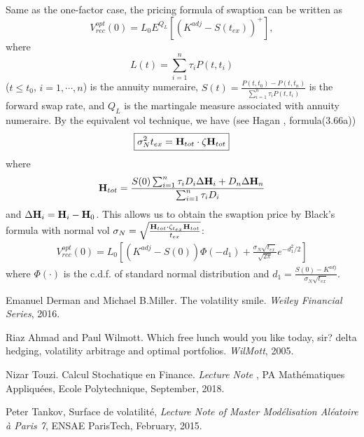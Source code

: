 \documentclass[10pt]{article}
\theoremstyle{plain}
\numberwithin{equation}{section}
\numberwithin{table}{section}
\begin{document}
Same as the one-factor case, the pricing formula of swaption can be written as
\[
V^{opt}_{rec}(0) = L_0 E^{Q_L}[(K^{adj}- S(t_{ex}))^+],
\]
where
\[
L(t) = \sum_{i=1}^n\tau_i P(t,t_i)
\]
($t\le t_0$, $i=1,\cdots, n$) is the annuity numeraire,
$S(t)=\frac{P(t,t_0)-P(t,t_n)}{\sum_{i=1}^n\tau_iP(t,t_i)}$ is the
forward swap rate, and $Q_L$ is the martingale measure associated with
annuity numeraire. By the equivalent vol technique, we have (see Hagan
\cite{Haganb}, formula(3.66a))
\begin{eqnarray}\label{formula_HW2F_calib_normal_vol}
\boxed{
\sigma_N^2t_{ex} = {\bf H}_{tot} \cdot \zeta {\bf H}_{tot}
}
\end{eqnarray}
where
\[
{\bf H}_{tot} = \frac{S(0)\sum_{i=1}^n \tau_i D_i \Delta {\bf H}_i +
D_n\Delta {\bf H}_n}{\sum_{i=1}^n\tau_iD_i}
\]
and $\Delta {\bf H}_i = {\bf H}_i - {\bf H}_0$. This allows us to
obtain the swaption price by Black's formula with normal vol $\sigma_N
= \sqrt{\frac{{\bf H}_{tot}\cdot \zeta_{t_{ex}}{\bf
H}_{tot}}{t_{ex}}}$:
\begin{eqnarray}\label{formula_HW2F_swaption_approximate}
\boxed{
V_{rec}^{opt}(0) = L_0
\left[(K^{adj}-S(0))\Phi(-d_1)+\frac{\sigma_N\sqrt{t_{ex}}}{\sqrt{2\pi}}e^{-d_1^2/2}\right]
}
\end{eqnarray}
where $\Phi(\cdot)$ is the c.d.f. of standard normal distribution and
$d_1 = \frac{S(0)-K^{adj}}{\sigma_N \sqrt{t_{ex}}}$.




\begin{appendix}


\end{appendix}

\begin{thebibliography}{99}

 Emanuel Derman and Michael B.Miller. The volatility smile. {\it
Weiley Financial Series}, 2016.

 Riaz Ahmad and Paul Wilmott. Which free lunch would you like today, sir? delta hedging, volatility arbitrage and optimal portfolios. {\it
WilMott}, 2005.

 Nizar Touzi. Calcul Stochatique en Finance. {\it
Lecture Note} {\bf}, PA Math\'ematiques Appliqu\'ees, Ecole Polytechnique, September, 2018.

 Peter Tankov, Surface de volatilit\'e, {\it
Lecture Note of Master Mod\'elisation Al\'eatoire \`a Paris 7}, ENSAE ParisTech, February, 2015.

\end{thebibliography}
\end{document}
